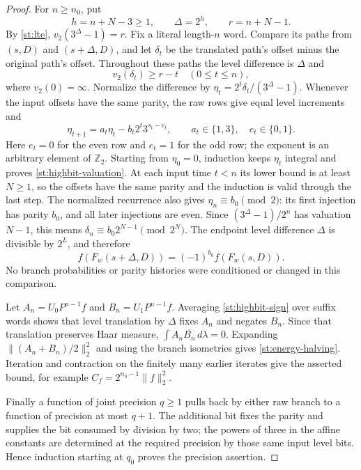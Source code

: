 \documentclass[11pt]{amsart}
\theoremstyle{definition}
\theoremstyle{remark}
\newcommand{\Ztwo}{\mathbb Z_2}
\begin{document}
\begin{proof}
For $n\ge n_0$, put
\[
 h=n+N-3\ge1,\qquad \Delta=2^h,\qquad r=n+N-1.
\]
By \eqref{st:lte}, $v_2(3^\Delta-1)=r$.  Fix a literal length-$n$
word.  Compare its paths from $(s,D)$ and $(s+\Delta,D)$, and let
$\delta_t$ be the translated path's offset minus the original path's
offset.  Throughout these paths the level difference is $\Delta$ and
\begin{equation}
 v_2(\delta_t)\ge r-t\quad(0\le t\le n),
 \label{st:highbit-valuation}
\end{equation}
where $v_2(0)=\infty$.  Normalize the difference by
$\eta_t=2^t\delta_t/(3^\Delta-1)$.  Whenever the input offsets have
the same parity, the raw rows give equal level increments and
\[
 \eta_{t+1}=a_t\eta_t-b_t2^t3^{s_t-e_t},
 \qquad a_t\in\{1,3\},\quad e_t\in\{0,1\}.
\]
Here $e_t=0$ for the even row and $e_t=1$ for the odd row; the exponent
is an arbitrary element of $\Ztwo$.  Starting from $\eta_0=0$, induction
keeps $\eta_t$ integral and proves \eqref{st:highbit-valuation}.  At each
input time $t<n$ its lower bound is at least $N\ge1$, so the offsets
have the same parity and the induction is valid through the last step.
The normalized recurrence also gives $\eta_n\equiv b_0\pmod2$:
its first injection has parity $b_0$, and all later injections are even.
Since $(3^\Delta-1)/2^n$ has valuation $N-1$, this means
$\delta_n\equiv b_0 2^{N-1}\pmod{2^N}$.  The endpoint level difference
$\Delta$ is divisible by $2^L$, and therefore
\begin{equation}
 f(F_w(s+\Delta,D))=(-1)^{b_0}f(F_w(s,D)).
 \label{st:highbit-sign}
\end{equation}
No branch probabilities or parity histories were conditioned or changed
in this comparison.

Let $A_n=U_0P^{n-1}f$ and $B_n=U_1P^{n-1}f$.  Averaging
\eqref{st:highbit-sign} over suffix words shows that level translation
by $\Delta$ fixes $A_n$ and negates $B_n$.  Since that translation
preserves Haar measure,
$\int A_n\overline{B_n}\,d\lambda=0$.  Expanding
$\|(A_n+B_n)/2\|_2^2$ and using the branch isometries gives
\eqref{st:energy-halving}.  Iteration and contraction on the finitely
many earlier iterates give the asserted bound, for example
$C_f=2^{n_0-1}\|f\|_2^2$.

Finally a function of joint precision $q\ge1$ pulls back by either raw
branch to a function of precision at most $q+1$.  The additional bit
fixes the parity and supplies the bit consumed by division by two; the
powers of three in the affine constants are determined at the required
precision by those same input level bits.  Hence induction starting at
$q_0$ proves the precision assertion.
\end{proof}
\end{document}
